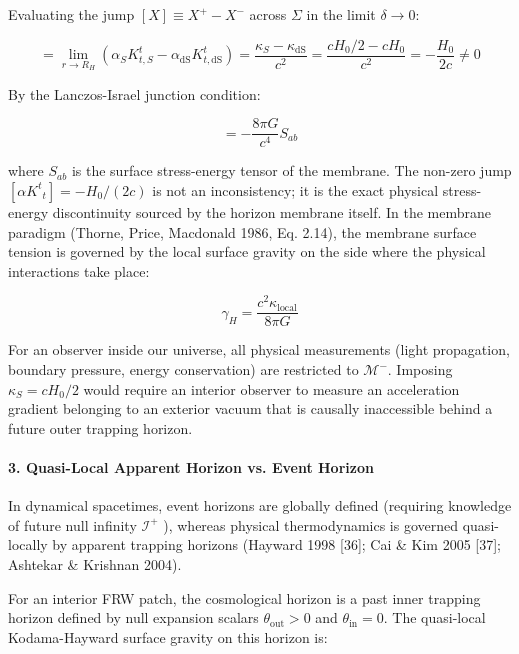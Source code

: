 \documentclass[11pt,a4paper]{article}
\theoremstyle{definition}\newtheorem{definition}{Definition}
\theoremstyle{remark}\newtheorem{remark}{Remark}
\begin{document}
Evaluating the jump $[X] \equiv X^+ - X^-$ across $\Sigma$ in the limit $\delta \to 0$:


\begin{equation}
[\alpha K^t{}_t] = \lim_{r \to R_H} \left( \alpha_S K^t_{t,S} - \alpha_{\text{dS}} K^t_{t,\text{dS}} \right) = \frac{\kappa_S - \kappa_{\text{dS}}}{c^2} = \frac{c H_0 / 2 - c H_0}{c^2} = -\frac{H_0}{2 c} \neq 0
\end{equation}


By the Lanczos-Israel junction condition:


\begin{equation}
[K_{ab} - K h_{ab}] = -\frac{8\pi G}{c^4} S_{ab}
\end{equation}


where $S_{ab}$ is the surface stress-energy tensor of the membrane. The non-zero jump $[\alpha K^t{}_t] = -H_0 / (2c)$ is not an inconsistency; it is the exact physical stress-energy discontinuity sourced by the horizon membrane itself. In the membrane paradigm (Thorne, Price, Macdonald 1986, Eq. 2.14), the membrane surface tension is governed by the local surface gravity on the side where the physical interactions take place:


\begin{equation}
\gamma_H = \frac{c^2 \kappa_{\text{local}}}{8\pi G}
\end{equation}


For an observer inside our universe, all physical measurements (light propagation, boundary pressure, energy conservation) are restricted to $\mathcal{M}^-$. Imposing $\kappa_S = c H_0 / 2$ would require an interior observer to measure an acceleration gradient belonging to an exterior vacuum that is causally inaccessible behind a future outer trapping horizon.
\paragraph{3. Quasi-Local Apparent Horizon vs. Event Horizon}

In dynamical spacetimes, event horizons are globally defined (requiring knowledge of future null infinity $\mathscr{I}^+$ ), whereas physical thermodynamics is governed quasi-locally by apparent trapping horizons (Hayward 1998 [36]; Cai \& Kim 2005 [37]; Ashtekar \& Krishnan 2004).

For an interior FRW patch, the cosmological horizon is a past inner trapping horizon defined by null expansion scalars $\theta_{\text{out}} > 0$ and $\theta_{\text{in}} = 0$. The quasi-local Kodama-Hayward surface gravity on this horizon is:
\end{document}
